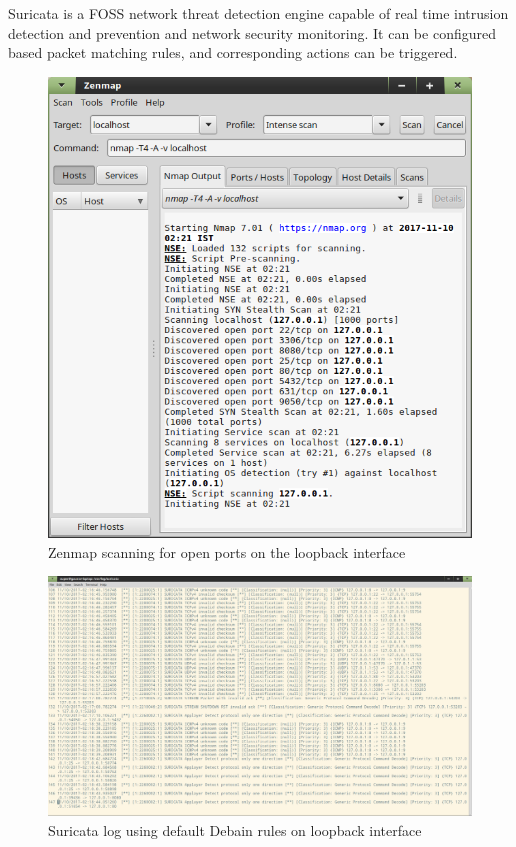 \documentclass[main.tex]{subfiles}
\begin{document}
Suricata is a FOSS network threat detection engine capable of real time
intrusion detection and prevention and network security monitoring.
It can be configured based packet matching rules, and corresponding actions can
be triggered.

\begin{figure}[H]
  \centering
  \includegraphics[width=\textwidth]{zenmap_scan.png}
  \caption{Zenmap scanning for open ports on the loopback interface}
\end{figure}

\begin{figure}[H]
  \centering
  \includegraphics[width=\textwidth]{suricata_log.png}
  \caption{Suricata log using default Debain rules on loopback interface}
\end{figure}
\end{document}
